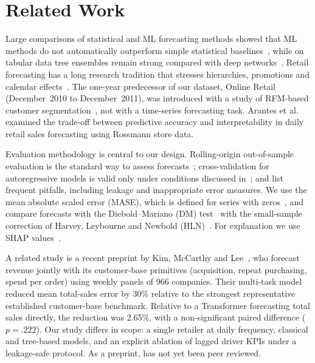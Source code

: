 \documentclass[conference]{IEEEtran}
\begin{document}
\section{Related Work}
Large comparisons of statistical and ML forecasting methods showed that ML methods do not automatically
outperform simple statistical baselines~\cite{makridakis2018}, while on tabular data tree ensembles remain
strong compared with deep networks~\cite{grinsztajn2022}. Retail forecasting has a long research tradition
that stresses hierarchies, promotions and calendar effects~\cite{fildes2022}. The one-year predecessor of our
dataset, Online Retail (December~2010 to December~2011), was introduced with a study of RFM-based customer %
segmentation~\cite{chen2012rfm}, not with a time-series forecasting task. Arantes et al.~\cite{arantes2025}
examined the trade-off between predictive accuracy and interpretability in daily retail sales forecasting
using Rossmann store data.

Evaluation methodology is central to our design. Rolling-origin out-of-sample evaluation is the standard way
to assess forecasts~\cite{tashman2000}; cross-validation for autoregressive models is valid only under
conditions discussed in~\cite{bergmeir2018}; and \cite{hewamalage2023} list frequent pitfalls, including
leakage and inappropriate error measures. We use the mean absolute scaled error (MASE), which is defined
for series with zeros~\cite{hyndman2006}, and compare forecasts with the Diebold--Mariano (DM)
test~\cite{diebold1995} with the small-sample correction of Harvey, Leybourne and Newbold
(HLN)~\cite{harvey1997}. For explanation we use SHAP values~\cite{lundberg2017shap}.

A related study is a recent preprint by Kim, McCarthy and Lee~\cite{kim2026drivers}, who forecast revenue
jointly with its customer-base primitives (acquisition, repeat purchasing, spend per order) using weekly
panels of 966 companies. Their multi-task model reduced mean total-sales error by 30\% relative to the
strongest representative established customer-base benchmark. Relative to a Transformer forecasting total
sales directly, the reduction was 2.65\%, with a non-significant paired difference ($p=.222$).
Our study differs in scope: a single retailer at daily frequency, classical and tree-based models, and an
explicit ablation of lagged driver KPIs under a leakage-safe protocol. As a preprint, \cite{kim2026drivers}
has not yet been peer reviewed.
\end{document}
